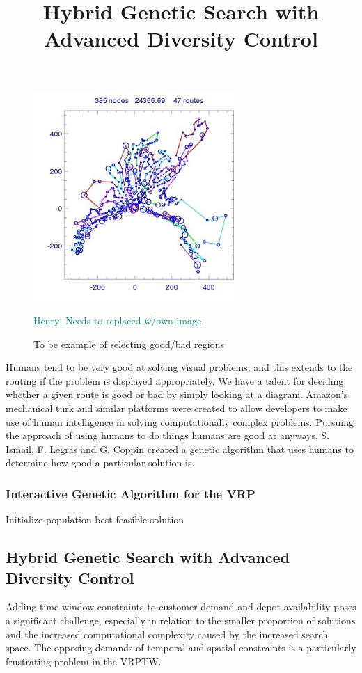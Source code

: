 \documentclass{sig-alternate}
\newcommand{\allcomments}[1]{{#1}}
\newcommand{\hfcomment}[1]{\textcolor{Teal}{\allcomments{Henry: {#1}}}}
\begin{document}
\begin{figure}
\centering
\includegraphics[width=3in, keepaspectratio]{vrp2.jpg}
\caption{To be example of selecting good/bad regions}
\hfcomment{Needs to replaced w/own image.}
\label{fig:Humangraph}
\end{figure}

Humans tend to be very good at solving visual problems, and this extends to the routing if the problem is displayed appropriately. We have a talent for deciding whether a given route is good or bad by simply looking at a diagram. Amazon's mechanical turk and similar platforms were created to allow developers to make use of human intelligence in solving computationally complex problems. Pursuing the approach of using humans to do things humans are good at anyways, S. Ismail, F. Legras and G. Coppin\cite{Ismail:2012} created a genetic algorithm that uses humans to determine how good a particular solution is. 

\subsubsection{Interactive Genetic Algorithm for the VRP}
\title{Hybrid Genetic Search with Advanced Diversity Control}
\begin{algorithm}
Initialize population\;
\Return best feasible solution\;
\end{algorithm}
 
\subsection{Hybrid Genetic Search with Advanced Diversity Control}
Adding time window constraints to customer demand and depot availability poses a significant challenge, especially in relation to the smaller proportion of solutions and the increased computational complexity caused by the increased search space. The opposing demands of temporal and spatial constraints is a particularly frustrating problem in the VRPTW.
\end{document}
